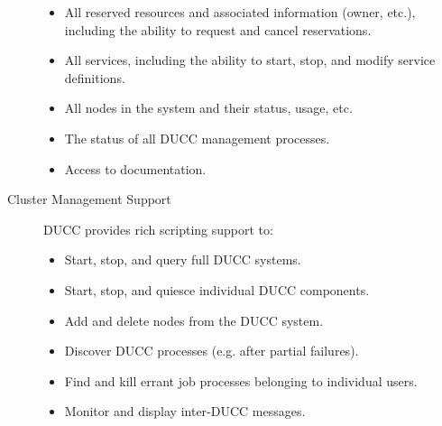\begin{description}
\begin{itemize}
              \item All reserved resources and associated information (owner, etc.),
                including the ability to request and cancel reservations.
                
              \item All services, including the ability to start, stop, and modify
                service definitions.
                
              \item All nodes in the system and their status, usage, etc. 
                                
              \item The status of all DUCC management processes.  

              \item Access to documentation.
          \end{itemize}


        \item[Cluster Management Support] DUCC provides rich scripting support to:
          \begin{itemize}
              \item Start, stop, and query full DUCC systems.
 
              \item Start, stop, and quiesce individual DUCC components.
 
              \item Add and delete nodes from the DUCC system.
 
              \item Discover DUCC processes (e.g. after partial failures).
 
              \item Find and kill errant job processes belonging to individual users.
                
              \item Monitor and display inter-DUCC messages.
          \end{itemize}
      \end{description}

